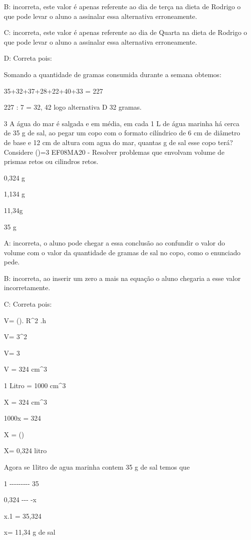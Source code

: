 B: incorreta, este valor é apenas referente ao dia de terça na dieta de
Rodrigo o que pode levar o aluno a assinalar essa alternativa
erroneamente.

C: incorreta, este valor é apenas referente ao dia de Quarta na dieta de
Rodrigo o que pode levar o aluno a assinalar essa alternativa
erroneamente.

D: Correta pois:

Somando a quantidade de gramas consumida durante a semana obtemos:

35+32+37+28+22+40+33 = 227

227 : 7 = 32, 42 logo alternativa D 32 gramas.

\num{3} A água do mar é salgada e em média, em cada 1 L de água marinha há
cerca de 35 g de sal, ao pegar um copo com o formato cilíndrico de 6 cm
de diâmetro de base e 12 cm de altura com agua do mar, quantas g de sal
esse copo terá? Considere (\Pi)=3 EF08MA20 - Resolver problemas que
envolvam volume de prismas retos ou cilindros retos.

\item 0,324 g
\item 1,134 g
\item 11,34g
\item 35 g

A: incorreta, o aluno pode chegar a essa conclusão ao confundir o valor
do volume com o valor da quantidade de gramas de sal no copo, como o
enunciado pede.

B: incorreta, ao inserir um zero a mais na equação o aluno chegaria a
esse valor incorretamente.

C: Correta pois:

V= (\Pi). R^2 .h

V= 3^2

V= 3

V = 324 cm^3

1 Litro = 1000 cm^3

X = 324 cm^3

1000x = 324

X = ()

X= 0,324 litro

Agora se 1litro de agua marinha contem 35 g de sal temos que

1 -\/-\/-\/-\/-\/-\/-\/-\/- 35

0,324 -\/-\/- -x

x.1 = 35,324

x= 11,34 g de sal

